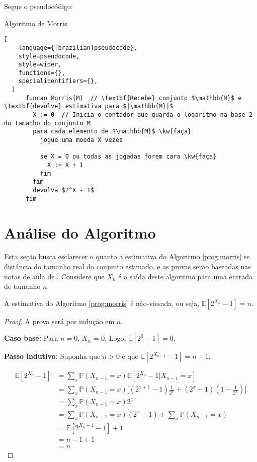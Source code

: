 Segue o pseudocódigo:
\begin{programruledcaption}{Algoritmo de Morris\label{prog:morris}}
  \begin{lstlisting}[
    language={[brazilian]pseudocode},
    style=pseudocode,
    style=wider,
    functions={},
    specialidentifiers={},
  ]
      funcao Morris(M)  // \textbf{Recebe} conjunto $\mathbb{M}$ e \textbf{devolve} estimativa para $|\mathbb{M}|$
        X := 0  // Inicia o contador que guarda o logarítmo na base 2 do tamanho do conjunto M
        para cada elemento de $\mathbb{M}$ \kw{faça}
          jogue uma moeda X vezes

          se X = 0 ou todas as jogadas forem cara \kw{faça}
            X := X + 1
          fim
        fim
        devolva $2^X - 1$
      fim
  \end{lstlisting}
\end{programruledcaption}

\section{Análise do Algoritmo}
\label{sec:morris:analysis}

Esta seção busca esclarecer o quanto a estimativa do Algoritmo \ref{prog:morris} se distância do tamanho real do conjunto estimado, e as provas
serão baseadas nas notas de aula de \citep{LectureNotesAndoni}.
Considere que $X_n$ é a saída deste algoritmo para uma entrada de tamanho $n$.

\begin{lemma} \label{morris:expected_value}
A estimativa do Algoritmo \ref{prog:morris} é não-viesada, ou seja, $\mathbb{E}[2^{X_n} - 1] = n$.
\end{lemma}

\begin{proof}
A prova será por indução em $n$. 

\textbf{Caso base:} Para $n = 0$, $X_n$ = 0. Logo, $\mathbb{E}[2^0 - 1] = 0$.

\textbf{Passo indutivo:} Suponha que $n > 0$ e que $\mathbb{E}[2^{X_{n-1}} - 1] = n-1$.

\begin{align*}
  \mathbb{E}[2^{X_n} - 1] 
    &= \sum_{x} \mathbb{P} (X_{n-1} = x) \mathbb{E}[2^{X_n} - 1 | X_{n-1} = x] \\
    &= \sum_{x} \mathbb{P} (X_{n-1} = x) \Big[ (2^{x+1} - 1) \frac{1}{2^x} +  (2^x - 1) (1 - \frac{1}{2^x}) \Big] \\
    &= \sum_{x} \mathbb{P} (X_{n-1} = x) 2^x \\
    &= \sum_{x} \mathbb{P} (X_{n-1} = x) (2^x - 1) + \sum_{x} \mathbb{P} (X_{n-1} = x) \\
    &= \mathbb{E}[2^{X_n-1} - 1] + 1 \\
    &= n - 1 + 1 \\
    &= n
\end{align*}

\end{proof}

